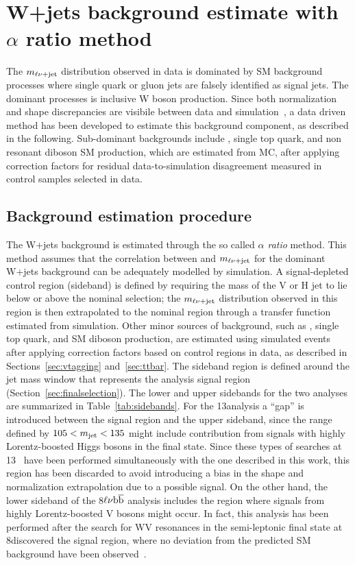 \section{W+jets background estimate with $\alpha$ ratio method}\label{sec:alpha}

The $m_{\ell\nu+{\rm jet}}$ distribution observed in data is dominated by SM background processes where single
quark or gluon jets are falsely identified as signal jets. The dominant processes is inclusive W boson production. 
Since both normalization and shape discrepancies are visibile between data and simulation~\cite{Chatrchyan:2013vbb},
a data driven method has been developed to estimate this background component, as described in the following.
Sub-dominant backgrounds include \ttbar, single top quark, and non resonant diboson SM production,
which are estimated from MC, after applying correction factors for residual data-to-simulation disagreement measured in control samples selected in data.

\subsection{Background estimation procedure}

The W+jets background is estimated through the so called \textit{$\alpha$ ratio} method.
This method assumes that the correlation between \mJ and $m_{\ell\nu+{\rm jet}}$ for the dominant W+jets background can be adequately modelled by simulation.
A signal-depleted control region (sideband) is defined by requiring the mass of the V or H jet to lie below or above the nominal selection; the
$m_{\ell\nu+{\rm jet}}$ distribution observed in this region is then extrapolated to the nominal region through
a transfer function estimated from simulation. Other minor sources of background, such as
\ttbar, single top quark, and SM diboson production, are estimated using simulated events after
applying correction factors based on control regions in data, as described in Sections~\ref{sec:vtagging} and~\ref{sec:ttbar}.
The sideband region is defined around the jet mass window that represents the analysis signal region (Section~\ref{sec:finalselection}).
The lower and upper sidebands for the two analyses are summarized in Table~\ref{tab:sidebands}.
For the 13\TeV analysis a ``gap'' is introduced between the signal region and the upper sideband, since the
range defined by $105 < m_{\text{jet}} < 135$ might include contribution from signals with highly Lorentz-boosted Higgs bosons in the final state.
Since these types of searches at 13\TeV~\cite{Khachatryan:2016cfx} have been performed simultaneously with the one described in this work,
this region has been discarded to avoid introducing a bias in the shape and normalization extrapolation due to a possible signal.
On the other hand, the lower sideband of the 8\TeV $\ell\nu{\mathrm{b}\overline{\mathrm{b}}}$ analysis includes the region where signals from highly Lorentz-boosted V bosons might occur.
In fact, this analysis has been performed after the search for WV resonances in the semi-leptonic final state at 8\TeV discovered the signal region,
where no deviation from the predicted SM background have been observed~\cite{Khachatryan:2014gha}.

